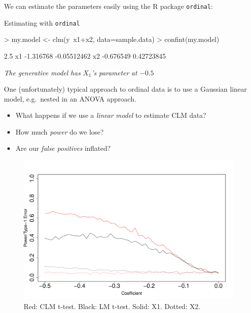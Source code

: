 \documentclass{beamer}
\begin{document}
\begin{frame}[fragile]
We can estimate the parameters easily using the R package \texttt{ordinal}:
\begin{block}{Estimating with \texttt{ordinal}}
\begin{Schunk}
\begin{Sinput}
> my.model <- clm(y~x1+x2, data=sample.data)
> confint(my.model)
\end{Sinput}
\begin{Soutput}
       2.5 %
x1 -1.316768 -0.05512462
x2 -0.676549  0.42723845
\end{Soutput}
\end{Schunk}
\end{block}

\emph{The generative model has $X_1$'s parameter at $-0.5$}
\end{frame}

\begin{frame}
One (unfortunately) typical approach to ordinal data is to use a Gaussian linear
model, e.g.\ nested in an ANOVA approach.

\begin{itemize}
\item What happens if we use a \emph{linear model} to estimate CLM data?
\item How much \emph{power} do we lose?
\item Are our \emph{false positives} inflated?
\end{itemize}
\end{frame}


\begin{frame}
\begin{figure}
\centering
\includegraphics[width=1.0\textwidth]{experiment_plot}
\caption{Red: CLM t-test. Black: LM t-test. Solid: X1. Dotted: X2.}
\label{fig:sample_boxplot}
\end{figure}
\end{frame}
\end{document}
